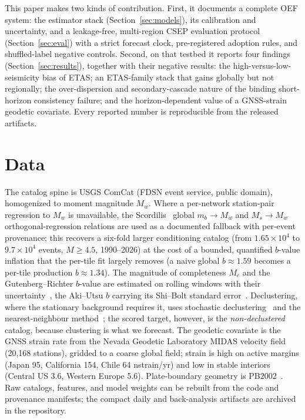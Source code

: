 \documentclass[journal]{IEEEtran}
\begin{document}
This paper makes two kinds of contribution. First, it documents a complete OEF system:
the estimator stack (Section~\ref{sec:models}), its calibration and
uncertainty, and a leakage-free, multi-region CSEP evaluation protocol
(Section~\ref{sec:eval}) with a strict forecast clock, pre-registered adoption rules, and
shuffled-label negative controls. Second, on that testbed it reports four findings
(Section~\ref{sec:results}), together with their negative results: the
high-versus-low-seismicity bias of ETAS; an ETAS-family stack that gains globally but not
regionally; the over-dispersion and secondary-cascade nature of the binding short-horizon
consistency failure; and the horizon-dependent value of a GNSS-strain geodetic covariate.
Every reported number is reproducible from the released artifacts.

\section{Data}
\label{sec:data}

The catalog spine is USGS ComCat (FDSN event service, public domain), homogenized to
moment magnitude $M_w$. Where a per-network station-pair regression to $M_w$ is
unavailable, the Scordilis~\cite{scordilis2006} global $m_b\!\to\!M_w$ and $M_s\!\to\!M_w$
orthogonal-regression relations are used as a documented fallback with per-event
provenance; this recovers a six-fold larger conditioning catalog (from $1.65\times10^4$
to $9.7\times10^4$ events, $M\!\ge\!4.5$, 1990--2026) at the cost of a bounded, quantified
$b$-value inflation that the per-tile fit largely removes (a naive global $b\approx1.59$
becomes a per-tile production $b\approx1.34$). The magnitude of completeness $M_c$ and the
Gutenberg--Richter $b$-value are estimated on rolling windows with their
uncertainty~\cite{wiemer2000,woessner2005}, the Aki--Utsu $b$ carrying its Shi--Bolt
standard error~\cite{shi1982}. Declustering, where the stationary background requires it,
uses stochastic declustering~\cite{zhuang2002} and the nearest-neighbour
method~\cite{zaliapin2013}; the scored target, however, is the \emph{non-declustered}
catalog, because clustering is what we forecast. The geodetic covariate is the GNSS strain
rate from the Nevada Geodetic Laboratory MIDAS velocity field~\cite{blewitt2016}
(20{,}168 stations), gridded to a coarse global field; strain is high on active margins
(Japan 95, California 154, Chile 64 nstrain/yr) and low in stable interiors (Central US
3.6, Western Europe 5.6). Plate-boundary geometry is PB2002~\cite{bird2003}. Raw catalogs,
features, and model weights can be rebuilt from the code and provenance manifests; the
compact daily and back-analysis artifacts are archived in the repository.
\end{document}
